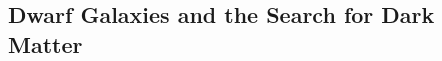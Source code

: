 \documentclass[oneside,11pt]{amsart}
\newcommand{\note}[2][todo]{{\color{#1}[[{\bf #2}]]}}
\begin{document}
  
%    







\subsection{Dwarf Galaxies and the Search for Dark Matter} 
\label{sec:darkmatter}
\end{document}
